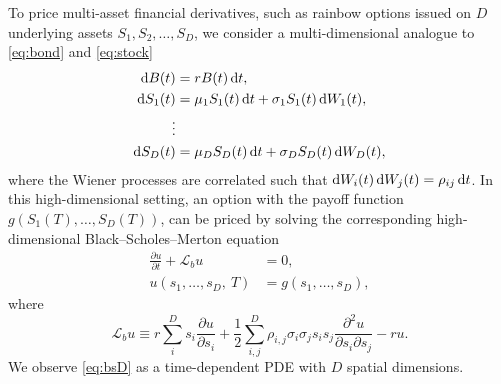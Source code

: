 \documentclass{UUThesisTemplate}
\begin{document}
\par
To price multi-asset financial derivatives, such as rainbow options issued on $D$ underlying assets $S_1,S_2,\ldots,S_D$, we consider a multi-dimensional analogue to \eqref{eq:bond} and \eqref{eq:stock}
\begin{align}
\dif B(t)&=rB(t)\dif t, \nonumber \\
\dif S_1(t)&=\mu_1 S_1(t)\dif t+\sigma_1 S_1(t)\dif W_1(t), \nonumber \\
\vdots \nonumber \\ 
\dif S_D(t)&=\mu_D S_D(t)\dif t+\sigma_D S_D(t)\dif W_D(t), \label{eq:multi}
\end{align}
where the Wiener processes are correlated such that $\dif W_i(t)\dif W_j(t)=\rho_{ij}\dif t$. In this high-dimensional setting, an option with the payoff function $g(S_1(T),\ldots,S_D(T))$, can be priced by solving the corresponding high-dimensional Black--Scholes--Merton equation
\begin{align}
\frac{\partial u}{\partial t}+\mathcal{L}_b u&=0, \nonumber \\
u(s_1,\ldots,s_D,\ T)&=g(s_1,\ldots,s_D), \label{eq:bsD}
\end{align}
where
\begin{equation}
\label{eqBSop}
\mathcal{L}_b u \equiv r\sum\limits_{i}^{D}s_i\frac{\partial u}{\partial{s_i}}+\frac{1}{2}\sum\limits_{i,j}^{D}\rho_{i,j}\sigma_i\sigma_j s_is_j\frac{\partial^2u}{\partial s_i \partial s_j}-ru.
\end{equation}
We observe \eqref{eq:bsD} as a time-dependent PDE with $D$ spatial dimensions.
\end{document}
